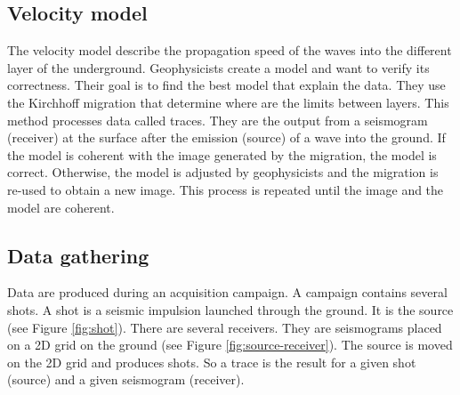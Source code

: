 \subsection{Velocity model}
The velocity model describe the propagation speed of the waves into the different layer of the underground.
Geophysicists create a model and want to verify its correctness.
Their goal is to find the best model that explain the data.
They use the Kirchhoff migration that determine where are the limits between layers.
This method processes data called traces.
They are the output from a seismogram (receiver) at the surface after the emission (source) of a wave into the ground.
If the model is coherent with the image generated by the migration, the model is correct.
Otherwise, the model is adjusted by geophysicists and the migration is re-used to obtain a new image.
This process is repeated until the image and the model are coherent.

\subsection{Data gathering}
Data are produced during an acquisition campaign.
A campaign contains several shots.
A shot is a seismic impulsion launched through the ground.
It is the source (see Figure \ref{fig:shot}).
There are several receivers.
They are seismograms placed on a 2D grid on the ground (see Figure \ref{fig:source-receiver}).
The source is moved on the 2D grid and produces shots.
So a trace is the result for a given shot (source) and a given seismogram (receiver).

